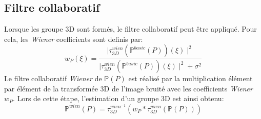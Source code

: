 \subsection{Filtre collaboratif}
Lorsque les groupe 3D sont formés, le filtre collaboratif peut être appliqué. Pour cela, les \textit{Wiener} coefficients sont definis par:
\begin{equation}
w_P(\xi) = \frac{\mid \tau^{wien}_{3D} (\mathbb{P}^{basic}(P))(\xi) \mid^2}{\mid \tau^{wien}_{3D}(\mathbb{P}^{basic}(P))(\xi) \mid^2 + \sigma^2}
\end{equation}
\newpage
Le filtre collaboratif \textit{Wiener} de \(\mathbb{P}(P)\) est réalisé par la multiplication élément par élément de la transformée 3D de l'image bruité avec les coefficients \textit{Wiener} \(w_P\). Lors de cette étape, l'estimation d'un groupe 3D est ainsi obtenu:
\begin{equation}
\mathbb{P}^{wien}(P) = \tau_{3D}^{wien^{-1}} (w_P * \tau_{3D}^{wien}(\mathbb{P}(P)))
\end{equation}
